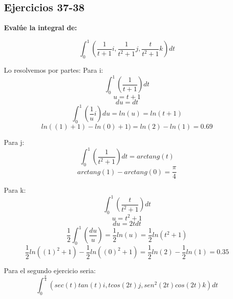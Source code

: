 \subsection{Ejercicios 37-38}\label{intro}

\textbf{Evalúe la integral de:}

\[\int_{0}^{1}(\frac{1}{t+1}i,\frac{1}{t^{2}+1}j,\frac{t}{t^{2}+1}k)dt\]

Lo resolvemos por partes:
Para i:
\[\int_{0}^{1}(\frac{1}{t+1})dt\]
\[u = t+1\]
\[du = dt\]
\[\int_{0}^{1}(\frac{1}{u}i)du = ln(u) = ln(t+1)\]
\[ln((1)+1) - ln(0)+1) = ln(2)-ln(1) = 0.69\]

Para j:
\[\int_{0}^{1}(\frac{1}{t^{2}+1})dt = arctang(t)\]
\[arctang(1) - arctang(0) = \frac{\pi}{4}\]

Para k:
\[\int_{0}^{1}(\frac{t}{t^{2}+1})dt\]
\[u = t^{2}+1\]
\[du = 2tdt\]
\[\frac{1}{2} \int_{0}^{1}(\frac{du}{u}) = \frac{1}{2}ln(u) = \frac{1}{2}ln(t^{2}+1)\]
\[\frac{1}{2}ln((1)^{2}+1)-\frac{1}{2}ln((0)^{2}+1) = \frac{1}{2}ln(2)-\frac{1}{2}ln(1) = 0.35\]

Para el segundo ejercicio seria: 
\[\int_{0}^{\frac{\pi }{4}}(sec(t)tan(t)i, tcos(2t)j, sen^{2}(2t)cos(2t)k)dt\]


